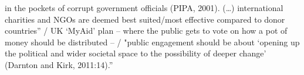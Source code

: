 in the pockets of corrupt government officials (PIPA, 2001). (…) international charities and NGOs are deemed best suited/most effective compared to donor countries” / UK ‘MyAid’ plan – where the public gets to vote on how a pot of money should be distributed – / "public engagement should be about ‘opening up the political and wider societal space to the possibility of deeper change’ (Darnton and Kirk, 2011:14).”


